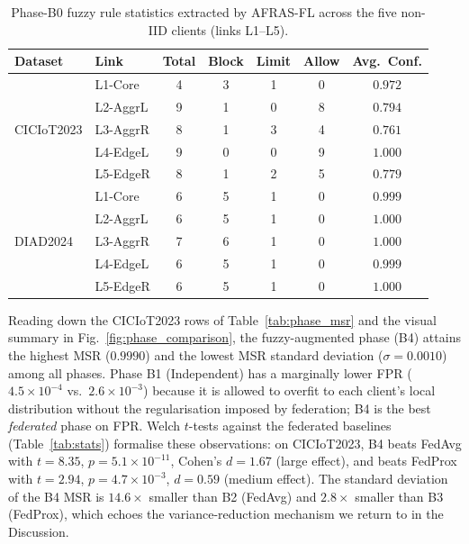 \documentclass[journal]{IEEEtran}
\begin{document}
\begin{table}[!htbp]
  \centering
  \caption{Phase-B0 fuzzy rule statistics extracted by AFRAS-FL across the
  five non-IID clients (links L1--L5).}\label{tab:phase_b0}
  \small
  \begin{tabular}{@{}llccccc@{}}
    \toprule
    \textbf{Dataset} & \textbf{Link} & \textbf{Total} & \textbf{Block} & \textbf{Limit} & \textbf{Allow} & \textbf{Avg.\ Conf.} \\
    \midrule
    \multirow{5}{*}{CICIoT2023}
      & L1-Core  & 4 & 3 & 1 & 0 & $0.972$ \\
      & L2-AggrL & 9 & 1 & 0 & 8 & $0.794$ \\
      & L3-AggrR & 8 & 1 & 3 & 4 & $0.761$ \\
      & L4-EdgeL & 9 & 0 & 0 & 9 & $1.000$ \\
      & L5-EdgeR & 8 & 1 & 2 & 5 & $0.779$ \\
    \midrule
    \multirow{5}{*}{DIAD2024}
      & L1-Core  & 6 & 5 & 1 & 0 & $0.999$ \\
      & L2-AggrL & 6 & 5 & 1 & 0 & $1.000$ \\
      & L3-AggrR & 7 & 6 & 1 & 0 & $1.000$ \\
      & L4-EdgeL & 6 & 5 & 1 & 0 & $0.999$ \\
      & L5-EdgeR & 6 & 5 & 1 & 0 & $1.000$ \\
    \bottomrule
  \end{tabular}
\end{table}

Reading down the CICIoT2023 rows of Table~\ref{tab:phase_msr} and
the visual summary in Fig.~\ref{fig:phase_comparison}, the
fuzzy-augmented phase (B4) attains the highest MSR ($0.9990$) and
the lowest MSR standard deviation ($\sigma = 0.0010$) among all
phases. Phase B1 (Independent) has a marginally lower FPR
($4.5 \times 10^{-4}$ vs.\ $2.6 \times 10^{-3}$) because it is
allowed to overfit to each client's local distribution without the
regularisation imposed by federation; B4 is the best \emph{federated}
phase on FPR. Welch $t$-tests against the federated baselines
(Table~\ref{tab:stats}) formalise these observations: on
CICIoT2023, B4 beats FedAvg with $t = 8.35$, $p = 5.1 \times
10^{-11}$, Cohen's $d = 1.67$ (large effect), and beats FedProx
with $t = 2.94$, $p = 4.7 \times 10^{-3}$, $d = 0.59$ (medium
effect). The standard deviation of the B4 MSR is $14.6\times$
smaller than B2 (FedAvg) and $2.8\times$ smaller than B3 (FedProx),
which echoes the variance-reduction mechanism we return to in the
Discussion.
\end{document}
